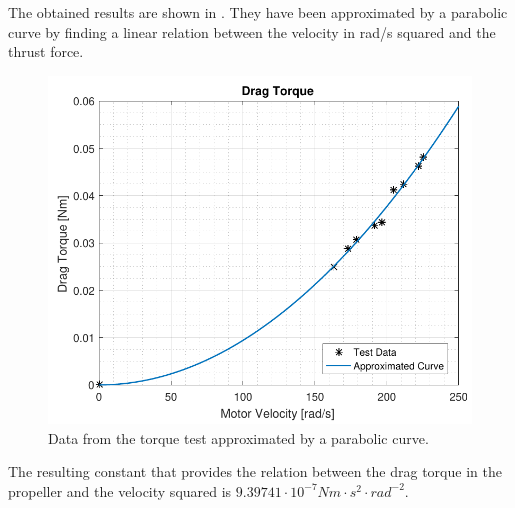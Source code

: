 The obtained results are shown in . They have been approximated by a parabolic curve by finding a linear relation between the velocity in rad/s squared and the thrust force.

\begin{figure}[H]
	\centering
	\includegraphics[scale=0.8]{figures/TorqueGraph}
	\caption{Data from the torque test approximated by a parabolic curve.}
	\label{TorqueGraph}
\end{figure}

The resulting constant that provides the relation between the drag torque in the propeller and the velocity squared is $9.39741\cdot10^{-7} Nm\cdot s^2\cdot rad^{-2}$.
